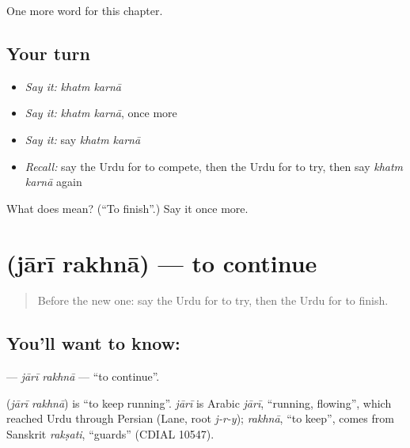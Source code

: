 \begin{grammarlens}[title={What you've built}]
One more word for this chapter.
\end{grammarlens}

\subsection*{Your turn}
\begin{itemize}
\raggedright
  \item \emph{Say it:} \emph{khatm karnā}
  \item \emph{Say it:} \emph{khatm karnā}, once more
  \item \emph{Say it:} say \emph{khatm karnā}
  \item \emph{Recall:} say the Urdu for to compete, then the Urdu for to try, then say \emph{khatm karnā} again
\end{itemize}

\begin{tcolorbox}[breakable,colback=teal!4,colframe=teal!35!black,title={Before you move on}]
What does   mean? (\textquotedblleft{}To finish\textquotedblright{}.) Say it once more.
\end{tcolorbox}
\section[\texorpdfstring{\ur{جاری} \ur{رکھنا} (jārī rakhnā)}{جاری رکھنا (jārī rakhnā)}]{  (jārī rakhnā) — to continue}

\label{lesson:UR-C242-jari-rakhna}



\begin{quote}
Before the new one: say the Urdu for to try, then the Urdu for to finish.
\end{quote}

\subsection*{You'll want to know:  }
\textbf{ } — \emph{jārī rakhnā} — \textquotedblleft{}to continue\textquotedblright{}.

\begin{cousinweb}
\textbf{ } (\emph{jārī rakhnā}) is \textquotedblleft{}to keep running\textquotedblright{}. \emph{jārī} is Arabic \emph{jārī}, \textquotedblleft{}running, flowing\textquotedblright{}, which reached Urdu through Persian (Lane, root \emph{j-r-y}); \emph{rakhnā}, \textquotedblleft{}to keep\textquotedblright{}, comes from Sanskrit \emph{rakṣati}, \textquotedblleft{}guards\textquotedblright{} (CDIAL 10547).
\end{cousinweb}

